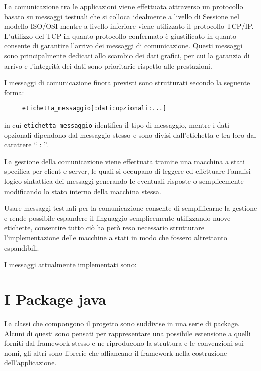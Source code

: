 La comunicazione tra le applicazioni viene effettuata attraverso un protocollo basato su messaggi testuali che si colloca idealmente a livello di Sessione nel modello ISO/OSI \cite{book:computernetworking} mentre a livello inferiore viene utilizzato il protocollo TCP/IP.
L'utilizzo del TCP in quanto protocollo confermato è giustificato in quanto consente di garantire l'arrivo dei messaggi di comunicazione. Questi messaggi sono principalmente dedicati allo scambio dei dati grafici, per cui la garanzia di arrivo e l'integrità dei dati sono prioritarie rispetto alle prestazioni.


I messaggi di comunicazione finora previsti sono strutturati secondo la seguente forma:
\begin{verbatim}
     etichetta_messaggio[:dati:opzionali:...]
\end{verbatim}
in cui \texttt{etichetta\_messaggio} identifica il tipo di messaggio, mentre i dati opzionali dipendono dal messaggio stesso e sono divisi dall'etichetta e tra loro dal carattere `` : ''.

La gestione della comunicazione viene effettuata tramite una macchina a stati specifica per client e server, le quali si occupano di leggere ed effettuare l'analisi logico-sintattica dei messaggi generando le eventuali risposte o semplicemente modificando lo stato interno della macchina stessa.



Usare messaggi testuali per la comunicazione consente di semplificarne la gestione e rende possibile espandere il linguaggio semplicemente utilizzando nuove etichette, consentire tutto ciò ha però reso necessario strutturare l'implementazione delle macchine a stati in modo che fossero altrettanto espandibili.



I messaggi attualmente implementati sono:





\section{I Package java} 
\label{sec:sfrc_packages}
La classi che compongono il progetto sono suddivise in una serie di package. %
Alcuni di questi sono pensati per rappresentare una possibile estensione a quelli forniti dal framework stesso e ne riproducono la struttura e le convenzioni sui nomi, gli altri sono librerie che affiancano il framework nella costruzione dell'applicazione.


